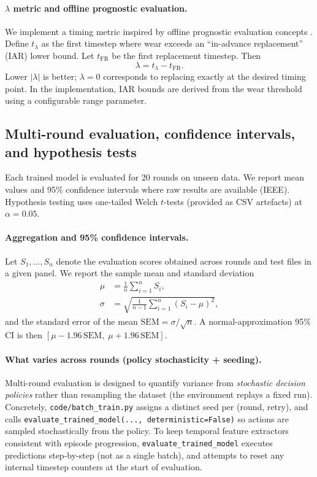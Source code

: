 \documentclass[11pt]{article}
\begin{document}
\paragraph{$\lambda$ metric and offline prognostic evaluation.}
We implement a timing metric inspired by offline prognostic evaluation concepts \parencite{Saxena2008Metrics}. Define $t_{\lambda}$ as the first timestep where wear exceeds an ``in-advance replacement'' (IAR) lower bound. Let $t_{\mathrm{FR}}$ be the first replacement timestep. Then
\begin{equation}
	\lambda = t_{\lambda} - t_{\mathrm{FR}}.
\end{equation}
Lower $|\lambda|$ is better; $\lambda=0$ corresponds to replacing exactly at the desired timing point. In the implementation, IAR bounds are derived from the wear threshold using a configurable range parameter.

\subsection{Multi-round evaluation, confidence intervals, and hypothesis tests}
Each trained model is evaluated for 20 rounds on unseen data. We report mean values and 95\% confidence intervals where raw results are available (IEEE). Hypothesis testing uses one-tailed Welch $t$-tests (provided as CSV artefacts) at $\alpha=0.05$.

\paragraph{Aggregation and 95\% confidence intervals.}
Let $S_1,\ldots,S_n$ denote the evaluation scores obtained across rounds and test files in a given panel. We report the sample mean and standard deviation
\begin{align}
\mu &= \frac{1}{n}\sum_{i=1}^{n} S_i,\\
\sigma &= \sqrt{\frac{1}{n-1}\sum_{i=1}^{n}(S_i-\mu)^2},
\end{align}
and the standard error of the mean $\mathrm{SEM}=\sigma/\sqrt{n}$. A normal-approximation 95\% CI is then $[\mu-1.96\,\mathrm{SEM},\;\mu+1.96\,\mathrm{SEM}]$.

\paragraph{What varies across rounds (policy stochasticity + seeding).}
Multi-round evaluation is designed to quantify variance from \emph{stochastic decision policies} rather than resampling the dataset (the environment replays a fixed run). Concretely, \texttt{code/batch\_train.py} assigns a distinct seed per (round, retry), and calls \texttt{evaluate\_trained\_model(..., deterministic=False)} so actions are sampled stochastically from the policy. To keep temporal feature extractors consistent with episode progression, \texttt{evaluate\_trained\_model} executes predictions step-by-step (not as a single batch), and attempts to reset any internal timestep counters at the start of evaluation.
\end{document}
